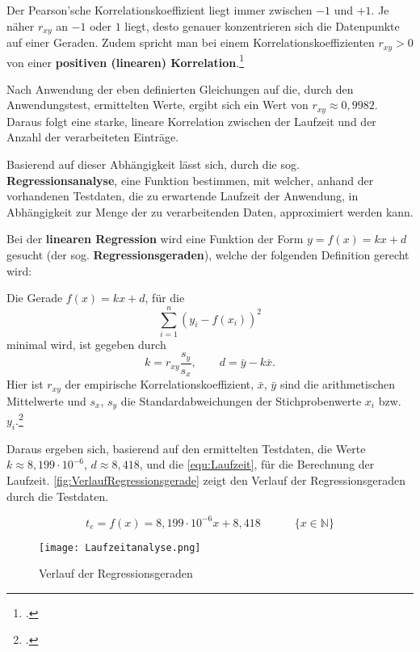 Der Pearson'sche Korrelationskoeffizient liegt immer zwischen $-1$ und $+1$. Je näher $r_{xy}$ an $-1$ oder $1$ liegt, desto genauer konzentrieren sich die Datenpunkte auf einer Geraden. Zudem spricht man bei einem Korrelationskoeffizienten $r_{xy}>0$ von einer \textbf{positiven (linearen) Korrelation}.\footcite[Vgl.][S. 214]{Teschl.2014}

Nach Anwendung der eben definierten Gleichungen auf die, durch den Anwendungstest, ermittelten Werte, ergibt sich ein Wert von $r_{xy} \approx 0,9982$. Daraus folgt eine starke, lineare Korrelation zwischen der Laufzeit und der Anzahl der verarbeiteten Einträge.

Basierend auf dieser Abhängigkeit lässt sich, durch die sog. \textbf{Regressionsanalyse}, eine Funktion bestimmen, mit welcher, anhand der vorhandenen Testdaten, die zu erwartende Laufzeit der Anwendung, in Abhängigkeit zur Menge der zu verarbeitenden Daten, approximiert werden kann.

Bei der \textbf{linearen Regression} wird eine Funktion der Form $y = f(x) = kx + d$ gesucht (der sog. \textbf{Regressionsgeraden}), welche der folgenden Definition gerecht wird:

\flqq Die Gerade $f(x) = kx + d$, für die
\begin{equation*}
\displaystyle\sum_{i=1}^{n} (y_i - f(x_i))^2
\end{equation*}
minimal wird, ist gegeben durch
\begin{equation*}
k = r_{xy} \frac{s_y}{s_x}, \quad \quad d = \bar{y} - k\bar{x}.
\end{equation*}
Hier ist $r_{xy}$ der empirische Korrelationskoeffizient, $\bar{x}$, $\bar{y}$ sind die arithmetischen Mittelwerte und $s_x$, $s_y$ die Standardabweichungen der Stichprobenwerte $x_i$ bzw. $y_i$.\frqq\footcite[216]{Teschl.2014}

Daraus ergeben sich, basierend auf den ermittelten Testdaten, die Werte $k \approx 8,199 \cdot 10^{-6}$, $d \approx 8,418$, und die \autoref{equ:Laufzeit}, für die Berechnung der Laufzeit. \autoref{fig:VerlaufRegressionsgerade} zeigt den Verlauf der Regressionsgeraden durch die Testdaten.

\begin{equation}
t_e = f(x) = 8,199 \cdot 10^{-6}x + 8,418 \quad \quad \quad \{x \in \mathbb{N}\} \label{equ:Laufzeit}
\end{equation}

\begin{figure}[h]
	\texttt{[image: Laufzeitanalyse.png]}
	\caption{Verlauf der Regressionsgeraden}
	\label{fig:VerlaufRegressionsgerade}
\end{figure}


